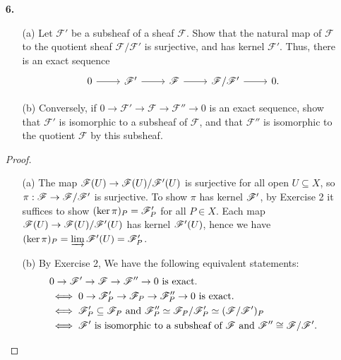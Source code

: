 \documentclass{article}
\begin{document}
\begin{enumerate} [label=\textbf{\arabic*.}, leftmargin=0em]
\item[\textbf{6.}] \begin{itemize}
    \item[(a)] Let $\mathscr{F}'$ be a subsheaf of a sheaf $\mathscr{F}$. Show that the natural map of $\mathscr{F}$ to the quotient sheaf $\mathscr{F} / \mathscr{F}'$ is surjective, and has kernel $\mathscr{F}'$. Thus, there is an exact sequence
    \[ \begin{tikzcd}
        0 \arrow[r] & \mathscr{F}' \arrow[r] & \mathscr{F} \arrow[r] & \mathscr{F}/\mathscr{F}' \arrow[r] & 0.
        \end{tikzcd} \]
    \item[(b)] Conversely, if $0 \to \mathscr{F}' \to \mathscr{F} \to \mathscr{F}'' \to 0$ is an exact sequence, show that $\mathscr{F}'$ is isomorphic to a subsheaf of $\mathscr{F}$, and that $\mathscr{F}''$ is isomorphic to the quotient $\mathscr{F}$ by this subsheaf.
\end{itemize}

\begin{proof} $ $ \vspace{0pt}
    \begin{itemize} [leftmargin=0cm]
        \item[(a)] The map $\mathscr{F}(U) \to \mathscr{F}(U) / \mathscr{F}'(U)$ is surjective for all open $U \subseteq X$, so $\pi : \mathscr{F} \to \mathscr{F} / \mathscr{F}'$ is surjective. To show $\pi$ has kernel $\mathscr{F}'$, by Exercise 2 it suffices to show $(\ker{\pi})_P = \mathscr{F}'_P$ for all $P \in X$. Each map $\mathscr{F}(U) \to \mathscr{F}(U) / \mathscr{F}'(U)$ has kernel $\mathscr{F}'(U)$, hence we have $(\ker{\pi})_P = \varinjlim \mathscr{F}'(U) = \mathscr{F}'_P$.
        
        \item[(b)] By Exercise 2, We have the following equivalent statements:
        \begin{align*}
            & 0 \to \mathscr{F}' \to \mathscr{F} \to \mathscr{F}'' \to 0 \text{ is exact.} \\
            & \iff 0 \to \mathscr{F}'_P \to \mathscr{F}_P \to \mathscr{F}''_P \to 0 \text{ is exact.} \\
            & \iff \mathscr{F}_P' \subseteq \mathscr{F}_P \text{ and } \mathscr{F}_P'' \simeq \mathscr{F}_P / \mathscr{F}'_P \simeq (\mathscr{F} / \mathscr{F}')_P \\
            & \iff \mathscr{F}' \text{ is isomorphic to a subsheaf of $\mathscr{F}$ and } \mathscr{F}'' \cong \mathscr{F} / \mathscr{F}'.
        \end{align*}
    \end{itemize}
\end{proof}


\end{enumerate}
\end{document}
